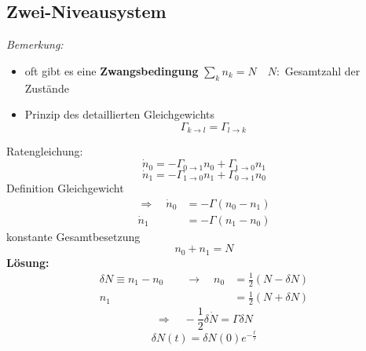 \documentclass[titlepage,11pt,a4paper,ngerman]{report}
\begin{document}
\subsection{Zwei-Niveausystem}

\begin{center}
\end{center}
\emph{Bemerkung:}
\begin{itemize}
	\item oft gibt es eine \textbf{Zwangsbedingung} $ \sum_k n_k = N \quad N : $ Gesamtzahl der Zustände
	\item Prinzip des detaillierten Gleichgewichts
	\begin{equation*}
	\Gamma_{k \to l} = \Gamma_{l \to k}
	\end{equation*}
\end{itemize}
Ratengleichung:
\begin{equation*}
\dot{n}_0 = - \Gamma_{0 \to 1} n_0 + \Gamma_{1 \to 0} n_1
\end{equation*}
\begin{equation*}
\dot{n}_1 = - \Gamma_{1 \to 0} n_1 + \Gamma_{0 \to 1} n_0
\end{equation*}
Definition Gleichgewicht
\begin{align*}
\Rightarrow \quad \dot{n}_0 &= - \Gamma(n_0 - n_1) \\
\dot{n}_1 &= - \Gamma (n_1 - n_0)
\end{align*}
konstante Gesamtbesetzung
\begin{equation*}
n_0 + n_1 = N
\end{equation*}
\textbf{Lösung:}
\begin{align*}
\delta N \equiv n_1 - n_0 \qquad \rightarrow \quad n_0 &= \frac{1}{2} (N - \delta N) \\
n_1 &= \frac{1}{2} (N + \delta N)
\end{align*}
\begin{equation*}
\Rightarrow \quad - \frac{1}{2} \delta \dot{N} = \Gamma \delta N
\end{equation*}
\begin{equation*}
\delta N(t) = \delta N(0) e^{-\frac{t}{\tau}}
\end{equation*}
\end{document}
